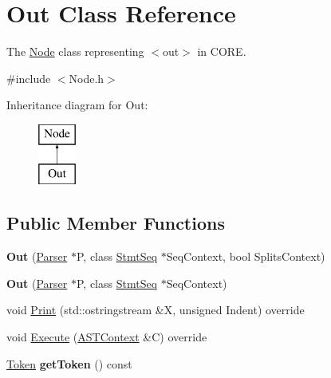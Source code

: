 \hypertarget{class_out}{}\section{Out Class Reference}
\label{class_out}


The \mbox{\hyperlink{class_node}{Node}} class representing {\ttfamily $<$out$>$} in C\+O\+RE.  




{\ttfamily \#include $<$Node.\+h$>$}

Inheritance diagram for Out\+:\begin{figure}[H]
\begin{center}
\leavevmode
\includegraphics[height=2.000000cm]{class_out}
\end{center}
\end{figure}
\subsection*{Public Member Functions}
\begin{DoxyCompactItemize}
\item 
\mbox{\label{class_out_aad62e170543a572e02cc2fdf2ac66ef5}} 
{\bfseries Out} (\mbox{\hyperlink{class_parser}{Parser}} $\ast$P, class \mbox{\hyperlink{class_stmt_seq}{Stmt\+Seq}} $\ast$Seq\+Context, bool Splits\+Context)
\item 
\mbox{\label{class_out_afe11888d3b8b3642dbb518fd59d48a51}} 
{\bfseries Out} (\mbox{\hyperlink{class_parser}{Parser}} $\ast$P, class \mbox{\hyperlink{class_stmt_seq}{Stmt\+Seq}} $\ast$Seq\+Context)
\item 
void \mbox{\hyperlink{class_out_a3aefc50458c5e3f05e3e7419c93c8eb5}{Print}} (std\+::ostringstream \&X, unsigned Indent) override
\item 
void \mbox{\hyperlink{class_out_a4ffa25656789ae40127a2f06d6e36207}{Execute}} (\mbox{\hyperlink{class_a_s_t_context}{A\+S\+T\+Context}} \&C) override
\item 
\mbox{\label{class_out_a652d69e9fb528580c94399f45ac68e84}} 
\mbox{\hyperlink{class_token}{Token}} {\bfseries get\+Token} () const
\end{DoxyCompactItemize}
